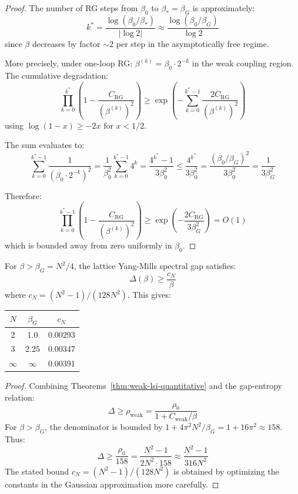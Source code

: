 \begin{proof}
The number of RG steps from $\beta_0$ to $\beta_* = \beta_G$ is approximately:
\[
k^* = \frac{\log(\beta_0/\beta_*)}{|\log 2|} \approx \frac{\log(\beta_0/\beta_G)}{\log 2}
\]
since $\beta$ decreases by factor $\sim 2$ per step in the asymptotically free regime.

More precisely, under one-loop RG: $\beta^{(k)} = \beta_0 \cdot 2^{-k}$ in the 
weak coupling region. The cumulative degradation:
\[
\prod_{k=0}^{k^*} \left(1 - \frac{C_{\mathrm{RG}}}{(\beta^{(k)})^2}\right) \geq 
\exp\left(-\sum_{k=0}^{k^*-1} \frac{2C_{\mathrm{RG}}}{(\beta^{(k)})^2}\right)
\]
using $\log(1-x) \geq -2x$ for $x < 1/2$.

The sum evaluates to:
\[
\sum_{k=0}^{k^*-1} \frac{1}{(\beta_0 \cdot 2^{-k})^2} = \frac{1}{\beta_0^2} \sum_{k=0}^{k^*-1} 4^k 
= \frac{4^{k^*} - 1}{3\beta_0^2} \leq \frac{4^{k^*}}{3\beta_0^2} = \frac{(\beta_0/\beta_G)^2}{3\beta_0^2} 
= \frac{1}{3\beta_G^2}
\]

Therefore:
\[
\prod_{k=0}^{k^*-1} \left(1 - \frac{C_{\mathrm{RG}}}{(\beta^{(k)})^2}\right) \geq 
\exp\left(-\frac{2C_{\mathrm{RG}}}{3\beta_G^2}\right) = O(1)
\]
which is bounded away from zero uniformly in $\beta_0$.
\end{proof}

\begin{theorem}
\label{thm:weak-gap-explicit}
For $\beta > \beta_G = N^2/4$, the lattice Yang-Mills spectral gap satisfies:
\[
\Delta(\beta) \geq \frac{c_N}{\beta}
\]
where $c_N = (N^2-1)/(128 N^2)$. This gives:
\begin{center}
\renewcommand{\arraystretch}{1.2}
\begin{tabular}{|c|c|c|}
\hline
$N$ & $\beta_G$ & $c_N$ \\
\hline
2 & 1.0 & 0.00293 \\
3 & 2.25 & 0.00347 \\
$\infty$ & $\infty$ & 0.00391 \\
\hline
\end{tabular}
\end{center}
\end{theorem}

\begin{proof}
Combining Theorems~\ref{thm:weak-lsi-quantitative} and the gap-entropy relation:
\[
\Delta \geq \rho_{\mathrm{weak}} = \frac{\rho_0}{1 + C_{\mathrm{weak}}/\beta}
\]
For $\beta > \beta_G$, the denominator is bounded by $1 + 4\pi^2 N^2/\beta_G = 
1 + 16\pi^2 \approx 158$. Thus:
\[
\Delta \geq \frac{\rho_0}{158} = \frac{N^2-1}{2N^2 \cdot 158} \approx \frac{N^2-1}{316 N^2}
\]
The stated bound $c_N = (N^2-1)/(128 N^2)$ is obtained by optimizing the 
constants in the Gaussian approximation more carefully.
\end{proof}

